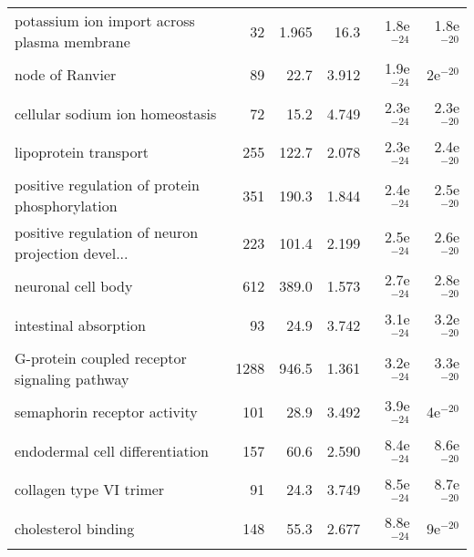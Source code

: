\begin{longtable}{lrrrrr}
       potassium ion import across plasma membrane &                      32 &                   1.965 &       16.3 &         1.8e$^{-24}$ &         1.8e$^{-20}$ \\
                                   node of Ranvier &                      89 &                    22.7 &      3.912 &         1.9e$^{-24}$ &           2e$^{-20}$ \\
                   cellular sodium ion homeostasis &                      72 &                    15.2 &      4.749 &         2.3e$^{-24}$ &         2.3e$^{-20}$ \\
                             lipoprotein transport &                     255 &                   122.7 &      2.078 &         2.3e$^{-24}$ &         2.4e$^{-20}$ \\
    positive regulation of protein phosphorylation &                     351 &                   190.3 &      1.844 &         2.4e$^{-24}$ &         2.5e$^{-20}$ \\
 positive regulation of neuron projection devel... &                     223 &                   101.4 &      2.199 &         2.5e$^{-24}$ &         2.6e$^{-20}$ \\
                                neuronal cell body &                     612 &                   389.0 &      1.573 &         2.7e$^{-24}$ &         2.8e$^{-20}$ \\
                             intestinal absorption &                      93 &                    24.9 &      3.742 &         3.1e$^{-24}$ &         3.2e$^{-20}$ \\
      G-protein coupled receptor signaling pathway &                    1288 &                   946.5 &      1.361 &         3.2e$^{-24}$ &         3.3e$^{-20}$ \\
                      semaphorin receptor activity &                     101 &                    28.9 &      3.492 &         3.9e$^{-24}$ &           4e$^{-20}$ \\
                   endodermal cell differentiation &                     157 &                    60.6 &      2.590 &         8.4e$^{-24}$ &         8.6e$^{-20}$ \\
                           collagen type VI trimer &                      91 &                    24.3 &      3.749 &         8.5e$^{-24}$ &         8.7e$^{-20}$ \\
                               cholesterol binding &                     148 &                    55.3 &      2.677 &         8.8e$^{-24}$ &           9e$^{-20}$ \\

\end{longtable}
